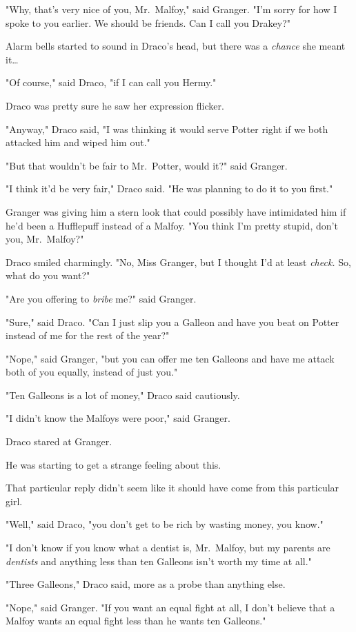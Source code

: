"Why, that's very nice of you, Mr.~Malfoy," said Granger. "I'm sorry for how I
spoke to you earlier. We should be friends. Can I call you Drakey?"

Alarm bells started to sound in Draco's head, but there was a \emph{chance} she
meant it{\ldots}

"Of course," said Draco, "if I can call you Hermy."

Draco was pretty sure he saw her expression flicker.

"Anyway," Draco said, "I was thinking it would serve Potter right if we both
attacked him and wiped him out."

"But that wouldn't be fair to Mr.~Potter, would it?" said Granger.

"I think it'd be very fair," Draco said. "He was planning to do it to you
first."

Granger was giving him a stern look that could possibly have intimidated him if
he'd been a Hufflepuff instead of a Malfoy. "You think I'm pretty stupid, don't
you, Mr.~Malfoy?"

Draco smiled charmingly. "No, Miss Granger, but I thought I'd at least
\emph{check.} So, what do you want?"

"Are you offering to \emph{bribe} me?" said Granger.

"Sure," said Draco. "Can I just slip you a Galleon and have you beat on Potter
instead of me for the rest of the year?"

"Nope," said Granger, "but you can offer me ten Galleons and have me attack
both of you equally, instead of just you."

"Ten Galleons is a lot of money," Draco said cautiously.

"I didn't know the Malfoys were poor," said Granger.

Draco stared at Granger.

He was starting to get a strange feeling about this.

That particular reply didn't seem like it should have come from this particular
girl.

"Well," said Draco, "you don't get to be rich by wasting money, you know."

"I don't know if you know what a dentist is, Mr.~Malfoy, but my parents are
\emph{dentists} and anything less than ten Galleons isn't worth my time at all."

"Three Galleons," Draco said, more as a probe than anything else.

"Nope," said Granger. "If you want an equal fight at all, I don't believe that
a Malfoy wants an equal fight less than he wants ten Galleons."

